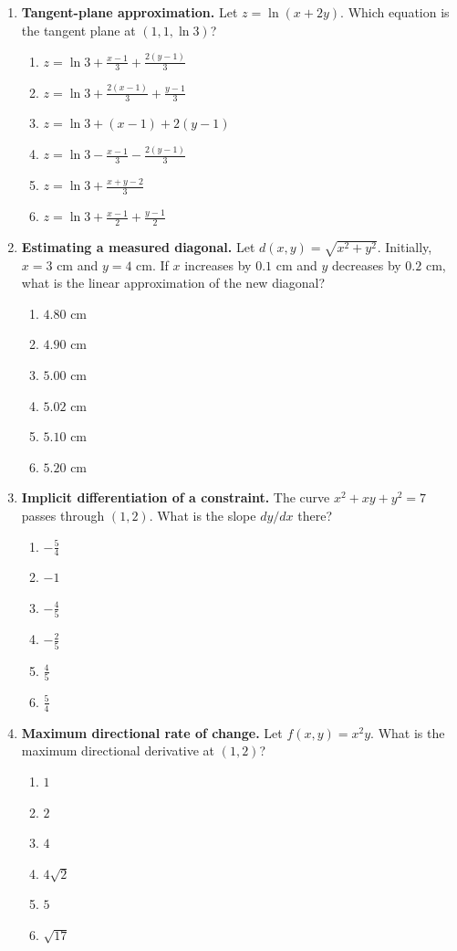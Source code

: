 \documentclass[a4paper,12pt]{article}
\theoremstyle{mystyle}
\numberwithin{equation}{section}
\numberwithin{theorem}{section}
\numberwithin{proposition}{section}
\numberwithin{example}{section}
\numberwithin{remark}{section}
\numberwithin{lemma}{section}
\numberwithin{corollary}{section}
\numberwithin{definition}{section}
\begin{document}
\begin{enumerate}[label=\textbf{Question \arabic*.},leftmargin=*]
\item \textbf{Tangent-plane approximation.} Let $z=\ln(x+2y)$. Which equation is the tangent plane at $(1,1,\ln3)$?
\begin{enumerate}[label=(\Alph*)]
\item $\displaystyle z=\ln3+\frac{x-1}{3}+\frac{2(y-1)}{3}$
\item $\displaystyle z=\ln3+\frac{2(x-1)}{3}+\frac{y-1}{3}$
\item $\displaystyle z=\ln3+(x-1)+2(y-1)$
\item $\displaystyle z=\ln3-\frac{x-1}{3}-\frac{2(y-1)}{3}$
\item $\displaystyle z=\ln3+\frac{x+y-2}{3}$
\item $\displaystyle z=\ln3+\frac{x-1}{2}+\frac{y-1}{2}$
\end{enumerate}

\item \textbf{Estimating a measured diagonal.} Let $d(x,y)=\sqrt{x^2+y^2}$. Initially, $x=3$ cm and $y=4$ cm. If $x$ increases by $0.1$ cm and $y$ decreases by $0.2$ cm, what is the linear approximation of the new diagonal?
\begin{enumerate}[label=(\Alph*)]
\item $4.80\text{ cm}$
\item $4.90\text{ cm}$
\item $5.00\text{ cm}$
\item $5.02\text{ cm}$
\item $5.10\text{ cm}$
\item $5.20\text{ cm}$
\end{enumerate}

\item \textbf{Implicit differentiation of a constraint.} The curve $x^2+xy+y^2=7$ passes through $(1,2)$. What is the slope $dy/dx$ there?
\begin{enumerate}[label=(\Alph*)]
\item $-\frac54$
\item $-1$
\item $-\frac45$
\item $-\frac25$
\item $\frac45$
\item $\frac54$
\end{enumerate}

\item \textbf{Maximum directional rate of change.} Let $f(x,y)=x^2y$. What is the maximum directional derivative at $(1,2)$?
\begin{enumerate}[label=(\Alph*)]
\item $1$
\item $2$
\item $4$
\item $4\sqrt2$
\item $5$
\item $\sqrt{17}$
\end{enumerate}


\end{enumerate}
\end{document}
